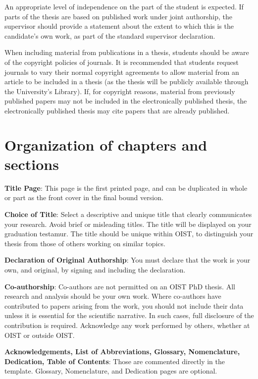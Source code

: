 An appropriate level of independence on the part of the student is expected. If parts of the thesis are based on published work under joint authorship, the supervisor should provide a statement about the extent to which this is the candidate's own work, as part of the standard supervisor declaration. 

When including material from publications in a thesis, students should be aware of the copyright policies of journals. It is recommended that students request journals to vary their normal copyright agreements to allow material from an article to be included in a thesis (as the thesis will be publicly available through the University's Library). If, for copyright reasons, material from previously published papers may not be included in the electronically published thesis, the electronically published thesis may cite papers that are already published. 

\section{Organization of chapters and sections}

\textbf{Title Page}:  This page is the first printed page, and can be duplicated in whole or part as the front cover in the final bound version.

\textbf{Choice of Title}: Select a descriptive and unique title that clearly communicates your research.  Avoid brief or misleading titles.  The title will be displayed on your graduation testamur.  The title should be unique within OIST, to distinguish your thesis from those of others working on similar topics.

\textbf{Declaration of Original Authorship}:  You must declare that the work is your own, and original,  by signing and including the declaration.  

\textbf{Co-authorship}:  Co-authors are not permitted on an OIST PhD thesis. All research and analysis should be your own work. Where co-authors have contributed to papers arising from the work, you should not include their data unless it is essential for the scientific narrative.  In such cases, full disclosure of the contribution is required. Acknowledge any work performed by others, whether at OIST or outside OIST.

\textbf{Acknowledgements, List of Abbreviations, Glossary, Nomenclature, Dedication, Table of Contents}: Those are commented directly in the template. Glossary, Nomenclature, and Dedication pages are optional.

